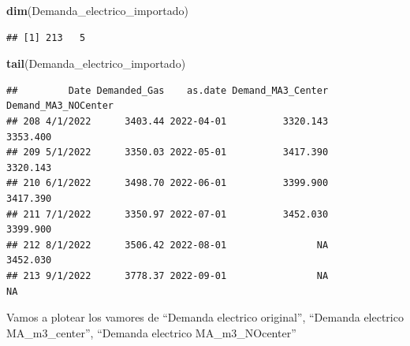 \documentclass[
]{article}
\newenvironment{Shaded}{\begin{snugshade}}{\end{snugshade}}
\newcommand{\FunctionTok}[1]{\textcolor[rgb]{0.13,0.29,0.53}{\textbf{#1}}}
\newcommand{\NormalTok}[1]{#1}
\begin{document}
\begin{Shaded}
\begin{Highlighting}[]
\FunctionTok{dim}\NormalTok{(Demanda\_electrico\_importado)}
\end{Highlighting}
\end{Shaded}

\begin{verbatim}
## [1] 213   5
\end{verbatim}

\begin{Shaded}
\begin{Highlighting}[]
\FunctionTok{tail}\NormalTok{(Demanda\_electrico\_importado)}
\end{Highlighting}
\end{Shaded}

\begin{verbatim}
##         Date Demanded_Gas    as.date Demand_MA3_Center Demand_MA3_NOCenter
## 208 4/1/2022      3403.44 2022-04-01          3320.143            3353.400
## 209 5/1/2022      3350.03 2022-05-01          3417.390            3320.143
## 210 6/1/2022      3498.70 2022-06-01          3399.900            3417.390
## 211 7/1/2022      3350.97 2022-07-01          3452.030            3399.900
## 212 8/1/2022      3506.42 2022-08-01                NA            3452.030
## 213 9/1/2022      3778.37 2022-09-01                NA                  NA
\end{verbatim}

Vamos a plotear los vamores de ``Demanda electrico original'', ``Demanda
electrico MA\_m3\_center'', ``Demanda electrico MA\_m3\_NOcenter''
\end{document}
